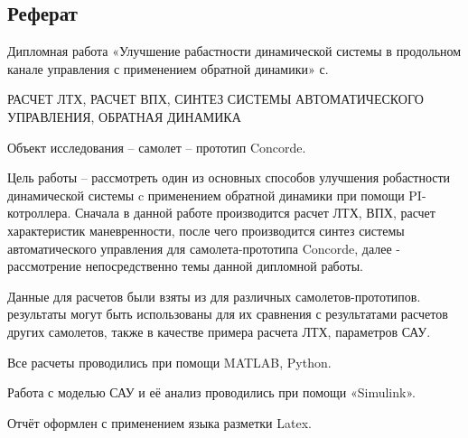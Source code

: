 
\newpage
\begin{center}
    \section*{Реферат}
\end{center}
\pagestyle{fancy}
\fancyhf{}
\rfoot{\thepage}
Дипломная работа «Улучшение рабастности динамической системы в продольном канале управления с применением обратной динамики» \pageref{LastPage} с.

РАСЧЕТ ЛТХ, РАСЧЕТ ВПХ, СИНТЕЗ СИСТЕМЫ АВТОМАТИЧЕСКОГО
УПРАВЛЕНИЯ, ОБРАТНАЯ ДИНАМИКА

Объект исследования -- самолет -- прототип Concorde.

Цель работы -- рассмотреть один из основных способов улучшения робастности динамической системы c применением обратной динамики при помощи PI-котроллера. Сначала в данной работе производится расчет ЛТХ, ВПХ, расчет
характеристик маневренности, после чего производится синтез системы
автоматического управления для самолета-прототипа Concorde, далее - 
рассмотрение непосредственно темы данной дипломной работы.

Данные для расчетов были взяты из \cite{Album} для различных самолетов-прототипов.
 результаты могут быть использованы для их сравнения с
результатами расчетов других самолетов, также в качестве примера расчета
ЛТХ, параметров САУ.

Все расчеты проводились при помощи MATLAB, Python. 

Работа с моделью САУ и её анализ проводились при помощи «Simulink». 

Отчёт оформлен с применением языка разметки Latex.
 
